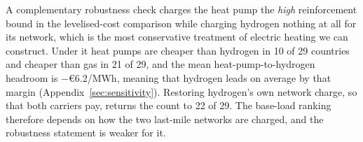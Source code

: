 A complementary robustness check charges the heat pump the \emph{high} reinforcement
bound in the levelised-cost comparison while charging hydrogen nothing at all for
its network, which is the most conservative treatment of electric heating we can
construct. Under it heat pumps are cheaper than hydrogen in 10 of 29 countries and
cheaper than gas in 21 of 29, and the mean heat-pump-to-hydrogen headroom is
$-$\euro{}6.2/MWh, meaning that hydrogen leads on average by that margin
(Appendix~\ref{sec:sensitivity}). Restoring hydrogen's own network charge, so that
both carriers pay, returns the count to 22 of 29. The base-load ranking therefore depends on how the two last-mile networks are charged,
and the robustness statement is weaker for it.

